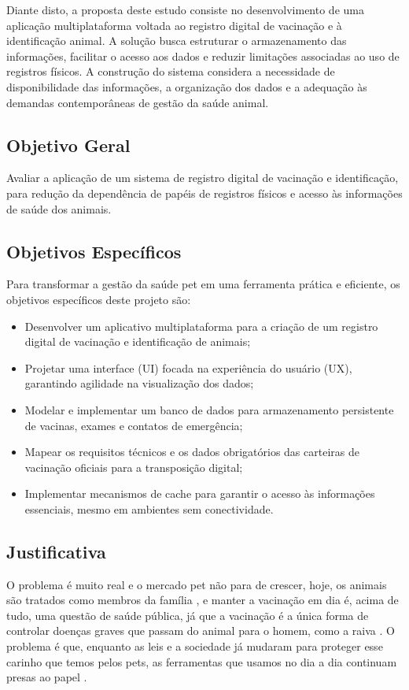 \documentclass{UNESC}
\begin{document}
Diante disto, a proposta deste estudo consiste no desenvolvimento de uma aplicação multiplataforma voltada ao registro digital de vacinação e à identificação animal. A solução busca estruturar o armazenamento das informações, facilitar o acesso aos dados e reduzir limitações associadas ao uso de registros físicos. A construção do sistema considera a necessidade de disponibilidade das informações, a organização dos dados e a adequação às demandas contemporâneas de gestão da saúde animal.

\subsection{Objetivo Geral}

Avaliar a aplicação de um sistema de registro digital de vacinação e identificação, para redução da dependência de papéis de registros físicos e acesso às informações de saúde dos animais.

\subsection{Objetivos Específicos}
 
Para transformar a gestão da saúde pet em uma ferramenta prática e eficiente, os objetivos específicos deste projeto são:
\begin{itemize}
    \item Desenvolver um aplicativo multiplataforma para a criação de um registro digital de vacinação e identificação de animais;
    \item Projetar uma interface (UI) focada na experiência do usuário (UX), garantindo agilidade na visualização dos dados;
    \item Modelar e implementar um banco de dados para armazenamento persistente de vacinas, exames e contatos de emergência;
    \item Mapear os requisitos técnicos e os dados obrigatórios das carteiras de vacinação oficiais para a transposição digital;
    \item Implementar mecanismos de cache para garantir o acesso às informações essenciais, mesmo em ambientes sem conectividade.
\end{itemize}

\subsection{Justificativa}

O problema é muito real e o mercado pet não para de crescer, hoje, os animais são tratados como membros da família \cite{BOLSON2022}, e manter a vacinação em dia é, acima de tudo, uma questão de saúde pública, já que a vacinação é a única forma de controlar doenças graves que passam do animal para o homem, como a raiva \cite{MOUTINHO2017}. O problema é que, enquanto as leis e a sociedade já mudaram para proteger esse carinho que temos pelos pets, as ferramentas que usamos no dia a dia continuam presas ao papel \cite{MARTINS2024}.
\end{document}
